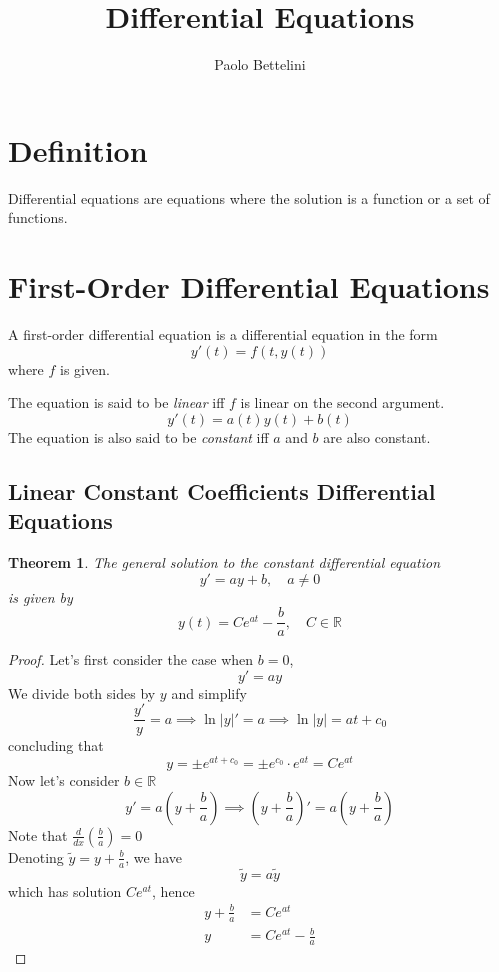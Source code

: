 \documentclass{article}
\title{Differential Equations}
\author{Paolo Bettelini}
\date{}
\newtheorem*{theorem1}{Theorem}
\begin{document}
\maketitle
\tableofcontents
\pagebreak

\section{Definition}

Differential equations are equations where the solution is a function
or a set of functions.

\section{First-Order Differential Equations}

A first-order differential equation is a differential equation in the form
\[
    y'(t)=f(t,y(t))
\]
where \(f\) is given.

The equation is said to be \textit{linear}
iff \(f\) is linear on the second argument.
\[
    y'(t)=a(t)y(t) + b(t)
\]
The equation is also said to be \textit{constant}
iff \(a\) and \(b\) are also constant.

\subsection{Linear Constant Coefficients Differential Equations}

\begin{theorem1}
    The general solution to the constant differential equation
    \[
        y' = ay+b,
        \quad a \neq 0
    \]
    is given by
    \[
        y(t)=Ce^{at}-\frac{b}{a}, \quad C \in \mathbb{R}
    \]
\end{theorem1}
\begin{proof}
    Let's first consider the case when \(b=0\),
    \[
        y'=ay
    \]
    We divide both sides by \(y\) and simplify
    \[
        \frac{y'}{y}=a
        \implies
        \ln|y|'=a
        \implies
        \ln|y|=at+c_0
    \]
    concluding that
    \[
        y = \pm e^{at+c_0}=\pm e^{c_0} \cdot e^{at} = Ce^{at}
    \]
    Now let's consider \(b \in \mathbb{R}\)
    \[
        y'=a\left(y+\frac{b}{a}\right)
        \implies
        \left(y + \frac{b}{a}\right)' = a\left(y + \frac{b}{a}\right)
    \]
    Note that \(\frac{d}{dx}\left(\frac{b}{a}\right)=0\) \\
    Denoting \(\tilde{y}=y+\frac{b}{a}\), we have
    \[
        \tilde{y}=a\tilde{y}
    \]
    which has solution \(Ce^{at}\), hence
    \begin{align*}
        y+\frac{b}{a}&=Ce^{at} \\
        y &= Ce^{at} - \frac{b}{a}
    \end{align*}
\end{proof}
\end{document}
